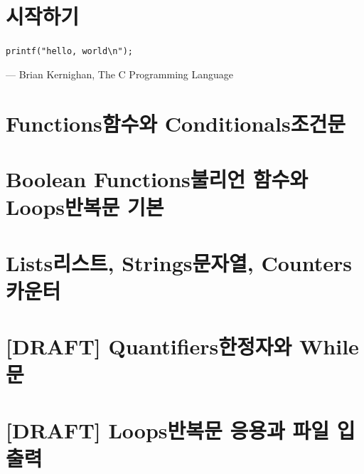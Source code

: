 \documentclass[a4paper,10pt]{memoir}
\begin{document}
\mainmatter
\chapter{시작하기}
\epigraph{%
  \texttt{printf("hello, world\textbackslash n");}%
}{%
  --- \textup{Brian Kernighan}, The C Programming Language%
}



\chapter{Functions함수와 Conditionals조건문}


\chapter{Boolean Functions불리언 함수와 Loops반복문 기본}


\chapter{Lists리스트, Strings문자열, Counters카운터}


\chapter{[DRAFT] Quantifiers한정자와 While 문}


\chapter{[DRAFT] Loops반복문 응용과 파일 입출력}

\end{document}
